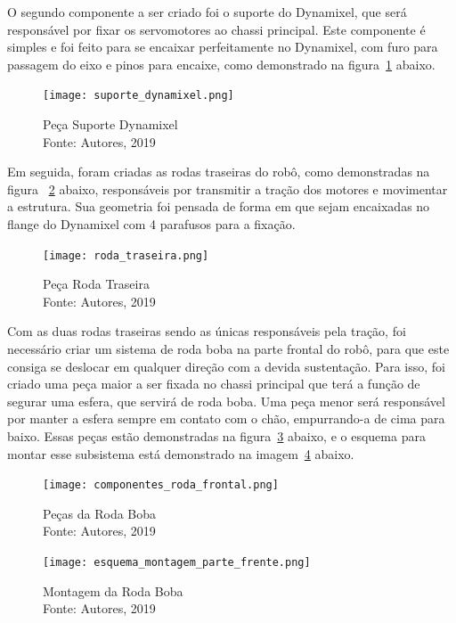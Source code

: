 O segundo componente a ser criado foi o suporte do Dynamixel, que será responsável por fixar os servomotores ao chassi principal. Este componente é simples e foi feito para se encaixar perfeitamente no Dynamixel, com furo para passagem do eixo e pinos
para encaixe, como demonstrado na figura~\ref{fig:sup_dyna} abaixo.

\begin{figure}[h!]
	\centering
	\texttt{[image: suporte\_dynamixel.png]}\\
	\caption{Peça Suporte Dynamixel \\ Fonte: Autores, 2019}
	\label{fig:sup_dyna}
\end{figure}

Em seguida, foram criadas as rodas traseiras do robô, como demonstradas na figura ~\ref{fig:roda_traseira} abaixo, responsáveis por transmitir a tração dos motores e movimentar a estrutura. Sua geometria foi pensada de forma em que sejam encaixadas no flange do Dynamixel com 4 parafusos para a fixação.

\begin{figure}[h!]
	\centering
	\texttt{[image: roda\_traseira.png]}\\
	\caption{Peça Roda Traseira \\ Fonte: Autores, 2019}
	\label{fig:roda_traseira}
\end{figure}

Com as duas rodas traseiras sendo as únicas responsáveis pela tração, foi necessário criar um sistema de roda boba na parte frontal do robô, para que este consiga se deslocar em qualquer direção com a devida sustentação. Para isso, foi criado uma peça
maior a ser fixada no chassi principal que terá a função de segurar uma esfera, que servirá de roda boba. Uma peça menor será responsável por manter a esfera sempre em contato com o chão, empurrando-a de cima para baixo. Essas peças estão demonstradas na figura~\ref{fig:roda_boba} abaixo, e o esquema para montar esse subsistema está demonstrado na imagem~\ref{fig:mont_roda_boba} abaixo.

\begin{figure}[h!]
	\centering
	\texttt{[image: componentes\_roda\_frontal.png]}\\
	\caption{Peças da Roda Boba \\ Fonte: Autores, 2019}
	\label{fig:roda_boba}
\end{figure}

\begin{figure}[h!]
	\centering
	\texttt{[image: esquema\_montagem\_parte\_frente.png]}\\
	\caption{Montagem da Roda Boba \\ Fonte: Autores, 2019}
	\label{fig:mont_roda_boba}
\end{figure}

